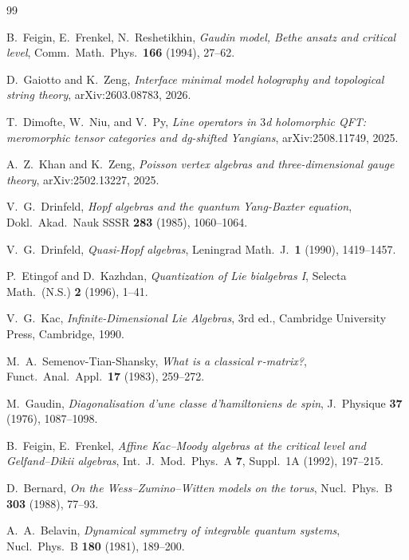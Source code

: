 \documentclass[11pt]{article}
\theoremstyle{plain}
\theoremstyle{definition}
\theoremstyle{remark}
\numberwithin{equation}{section}
\begin{document}

\begin{thebibliography}{99}

B.~Feigin, E.~Frenkel, N.~Reshetikhin, \emph{Gaudin model, Bethe
ansatz and critical level}, Comm.\ Math.\ Phys.\ \textbf{166}
(1994), 27--62.

D.~Gaiotto and K.~Zeng, \emph{Interface minimal model holography and
topological string theory}, arXiv:2603.08783, 2026.

T.~Dimofte, W.~Niu, and V.~Py, \emph{Line operators in $3$d
holomorphic QFT: meromorphic tensor categories and dg-shifted
Yangians}, arXiv:2508.11749, 2025.

A.~Z.~Khan and K.~Zeng, \emph{Poisson vertex algebras and
three-dimensional gauge theory}, arXiv:2502.13227, 2025.

V.~G.~Drinfeld, \emph{Hopf algebras and the quantum Yang-Baxter
equation}, Dokl.\ Akad.\ Nauk SSSR \textbf{283} (1985), 1060--1064.

V.~G.~Drinfeld, \emph{Quasi-Hopf algebras}, Leningrad Math.\ J.\
\textbf{1} (1990), 1419--1457.

P.~Etingof and D.~Kazhdan, \emph{Quantization of Lie bialgebras I},
Selecta Math.\ (N.S.) \textbf{2} (1996), 1--41.

V.~G.~Kac, \emph{Infinite-Dimensional Lie Algebras}, 3rd ed.,
Cambridge University Press, Cambridge, 1990.

M.~A.~Semenov-Tian-Shansky, \emph{What is a classical $r$-matrix?},
Funct.\ Anal.\ Appl.\ \textbf{17} (1983), 259--272.

M.~Gaudin, \emph{Diagonalisation d'une classe d'hamiltoniens de
spin}, J.\ Physique \textbf{37} (1976), 1087--1098.

B.~Feigin, E.~Frenkel,
\emph{Affine Kac--Moody algebras at the critical level and
Gelfand--Dikii algebras}, Int.\ J.\ Mod.\ Phys.\ A \textbf{7},
Suppl.\ 1A (1992), 197--215.

D.~Bernard, \emph{On the Wess--Zumino--Witten models on the torus},
Nucl.\ Phys.\ B \textbf{303} (1988), 77--93.

A.~A.~Belavin, \emph{Dynamical symmetry of integrable quantum
systems}, Nucl.\ Phys.\ B \textbf{180} (1981), 189--200.


\end{thebibliography}
\end{document}

